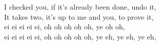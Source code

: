 I checked you, if it's already been done, undo it, \\
It takes two, it's up to me and you, to prove it, \\
ei ei ei ei ei, oh oh oh oh oh, ye oh oh, \\
ei ei ei ei ei, oh oh oh oh oh, ye eh, ye eh, ye eh,